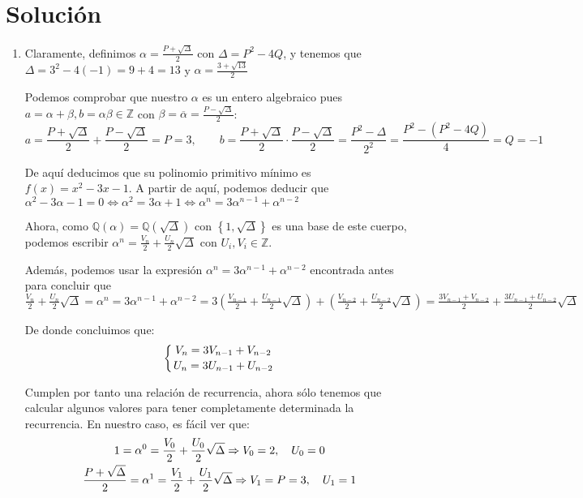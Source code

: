 \section*{Solución}
   \begin{enumerate}
        \item Claramente, definimos $\displaystyle \alpha = \frac{P + \sqrt{\Delta}}{2}$ con $\Delta = P^2 - 4Q$,
        y tenemos que $\Delta = 3^2 - 4(-1) = 9+4 = 13$ y $\displaystyle \alpha = \frac{3 + \sqrt{13}}{2}$
        
        Podemos comprobar que nuestro $\alpha$ es un entero algebraico pues $a = \alpha + \beta, b = \alpha
        \beta \in \mathbb{Z}$ con $\displaystyle \beta = \overline{\alpha} = \frac{P - \sqrt{\Delta}}{2}$:
        $$\displaystyle a = \frac{P + \sqrt{\Delta}}{2} + \frac{P - \sqrt{\Delta}}{2} = P = 3, \qquad
        b = \frac{P + \sqrt{\Delta}}{2} \cdot \frac{P - \sqrt{\Delta}}{2} = \frac{P^2-\Delta}{2^2} =
        \frac{P^2-(P^2-4Q)}{4} = Q = -1$$
        
        De aquí deducimos que su polinomio primitivo mínimo es $f(x) = x^2 -3x -1$. A partir de aquí, podemos
        deducir que $\alpha^2 -3\alpha -1 = 0 \Leftrightarrow \alpha^2  = 3\alpha +1 \Leftrightarrow \alpha^n =
        3\alpha^{n-1} + \alpha^{n-2}$
        
        Ahora, como $\mathbb{Q\left(\alpha\right)} = \mathbb{Q\left(\sqrt{\Delta}\right)}$ con $\left\lbrace1,
        \sqrt{\Delta}\right\rbrace$ es una base de este cuerpo, podemos escribir $\displaystyle \alpha^n =
        \frac{V_n}{2} + \frac{U_n}{2}\sqrt{\Delta}$ con $U_i, V_i \in \mathbb{Z}$.
        
        Además, podemos usar la expresión $\alpha^n  = 3\alpha^{n-1} + \alpha^{n-2}$ encontrada antes para
        concluir que $\displaystyle \frac{V_n}{2} + \frac{U_n}{2}\sqrt{\Delta} = \alpha^n  = 3\alpha^{n-1} +
        \alpha^{n-2} = 3\left(\frac{V_{n-1}}{2} + \frac{U_{n-1}}{2}\sqrt{\Delta}\right) +\left(\frac{V_{n-2}}{2} +
        \frac{U_{n-2}}{2}\sqrt{\Delta}\right) = \frac{3V_{n-1}+V_{n-2}}{2} + \frac{3U_{n-1}+U_{n-2}}{2}\sqrt{\Delta}$

        De donde concluimos que:
        $$\left\lbrace
   			V_n = 3V_{n-1}+V_{n-2} \atop
   			U_n = 3U_{n-1}+U_{n-2}
   		\right.$$
   		
   		Cumplen por tanto una relación de recurrencia, ahora sólo tenemos que calcular algunos valores para tener
   		completamente determinada la recurrencia. En nuestro caso, es fácil ver que:
		$$\left.
   			\displaystyle 1 = \alpha^0 = \frac{V_0}{2} + \frac{U_0}{2}\sqrt{\Delta} \Rightarrow V_0 = 2, \quad U_0 = 0 \atop
   			\displaystyle \frac{P + \sqrt{\Delta}}{2} = \alpha^1 = \frac{V_1}{2} + \frac{U_1}{2}\sqrt{\Delta}\Rightarrow V_1 = P = 3, \quad U_1 = 1 
   		\right.$$
   		

\end{enumerate}

